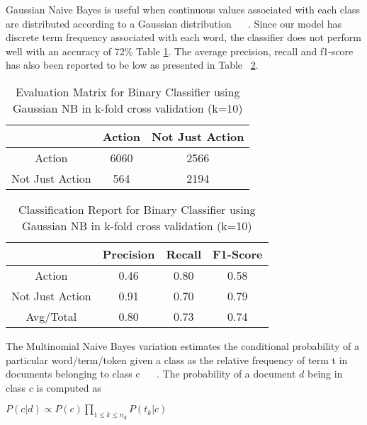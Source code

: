 \documentclass[11pt,letterpaper]{article}
\begin{document}
Gaussian Naive Bayes is useful when continuous values associated with each class are distributed according to a Gaussian distribution ~\cite{john1995estimating} ~\cite{salton1986introduction}. Since our model has discrete term frequency associated with each word, the classifier does not perform well with an accuracy of 72\% Table \ref{Evalution Matrix for Binary Classifier using Gaussian NB}. The average precision, recall and f1-score has also been reported to be low as presented in Table ~\ref{Classification Report for Binary Classifier using Gaussian NB}.\\

\begin{table}
\caption{Evaluation Matrix for Binary Classifier using Gaussian NB in k-fold cross validation (k=10)} \label{Evalution Matrix for Binary Classifier using Gaussian NB}
\begin{center}
\begin{tabular}{ |c|c|c| } 
 \hline
  & Action & Not Just Action \\ 
 \hline
 Action & 6060 & 2566 \\ 
 Not Just Action & 564 & 2194 \\ 
 \hline
\end{tabular}
\end{center}

\end{table}
\begin{table}
\caption{Classification Report for Binary Classifier using Gaussian NB in k-fold cross validation (k=10)} \label{Classification Report for Binary Classifier using Gaussian NB}
\begin{center}
\begin{tabular}{ |c|c|c|c| } 
 \hline
  & Precision & Recall & F1-Score \\ 
 \hline
 Action & 0.46 & 0.80 & 0.58 \\ 
 Not Just Action & 0.91 & 0.70 & 0.79 \\ 
 Avg/Total & 0.80 & 0.73 & 0.74 \\
 \hline
\end{tabular}
\end{center}
\end{table}

The Multinomial Naive Bayes variation estimates the conditional probability of a particular word/term/token given a class as the relative frequency of term t in documents belonging to class c ~\cite{mccallum1998comparison} ~\cite{salton1986introduction}. The probability of a document $d$ being in class $c$ is computed as 
 \begin{center}
 $ P(c|d) \propto P(c) \prod_{1 \leq k \leq n_d} P(t_k|c)$	 	 	
 \end{center}
 
\end{document}

